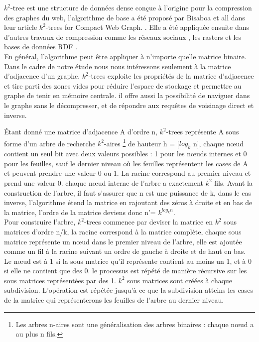 $k^2$-tree est une structure de données dense conçue à l'origine pour la compression des graphes du web, l'algorithme de base a été proposé par Bisaboa et all dans leur article $k^2$-trees for Compact Web Graph. \citep{brisaboa2009k}. Elle a été appliquée ensuite dans d'autres travaux de compression comme les réseaux sociaux \citep{shi2012optimizing}, les rasters \citep{de2013compact} et les bases de données RDF \citep{alvarez2017succinct}.\\
  
En général, l'algorithme peut être appliquer à n'importe quelle matrice binaire. Dans le cadre de notre étude nous nous intéressons seulement à la matrice d'adjacence d'un graphe.
$k^2$-trees exploite les propriétés de la matrice d'adjacence et tire parti des zones vides pour réduire l'espace de stockage et permettre au graphe de tenir en mémoire centrale. il offre aussi la possibilité de naviguer dans le graphe sans le décompresser, et de répondre aux requêtes de voisinage direct et inverse.

Étant donné une matrice d'adjacence A d'ordre n, $k^2$-trees représente A sous forme d'un arbre de recherche $k^2$-aires \footnote{Les arbres n-aires sont une généralisation des arbres binaires : chaque nœud a au plus n fils.} de hauteur h = [$log_{k}$ n], chaque nœud contient un seul bit avec deux valeurs possibles : 1 pour les nœuds internes et 0 pour les feuilles, sauf le dernier niveau où les feuilles représentent les cases de A et peuvent prendre une valeur 0 ou 1. La racine correspond au premier niveau et prend une valeur 0. chaque nœud interne de l'arbre a exactement $k^2$ fils.  
Avant la construction de l'arbre, il faut s'assurer que n est une puissance de k, dans le cas inverse, l'algorithme étend la matrice en rajoutant des zéros à droite et en bas de la matrice, l'ordre de la matrice deviens donc n'= $k^{log_{k} n}$.\\

Pour construire l'arbre, $k^2$-trees commence par deviser la matrice en $k^{2}$ sous matrices d'ordre n/k, la racine correspond à la matrice complète, chaque sous matrice représente un nœud dans le premier niveau de l'arbre, elle est ajoutée comme un fil à la racine suivant un ordre de gauche à droite et de haut en bas. Le nœud est à 1 si la sous matrice qu'il représente contient au moins un 1, et à 0 si elle ne contient que des 0. le processus est répété de manière récursive sur les sous matrices représentées par des 1. $k^{2}$ sous matrices sont créées à chaque subdivision. L'opération est répétée jusqu'à ce que la subdivision atteins les cases de la matrice qui représenterons les feuilles de l'arbre au dernier niveau. 

